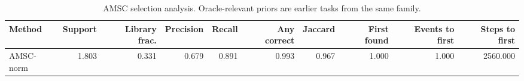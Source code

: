 \begin{table}[ht]
    \caption{AMSC selection analysis. Oracle-relevant priors are earlier tasks from the same family.}
    \label{tbl:amsc_selection}
    \centering
    \scriptsize
    \begin{tabular}{lrrrrrrrrr}
    \toprule
Method & Support & Library frac. & Precision & Recall & Any correct & Jaccard & First found & Events to first & Steps to first \\
    \midrule
AMSC-norm & 1.803 & 0.331 & 0.679 & 0.891 & 0.993 & 0.967 & 1.000 & 1.000 & 2560.000 \\
    \bottomrule
    \end{tabular}
\end{table}
